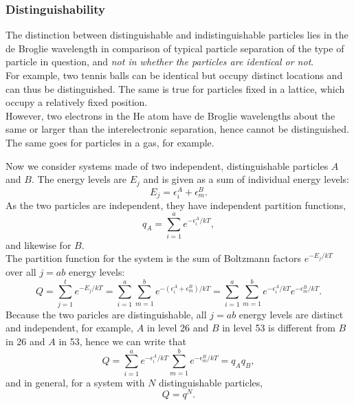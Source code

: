 \subsubsection{Distinguishability}
\begin{defi}[Distinguishability]
The distinction between distinguishable and indistinguishable particles lies in 
the de Broglie wavelength in comparison of typical particle separation of the 
type of particle in question, and \textit{not in whether the particles are identical or not}. \\
For example, two tennis balls can be identical but occupy distinct locations and can thus be distinguished. 
The same is true for particles fixed in a lattice, which occupy a relatively fixed position. \\
However, two electrons in the He atom have de Broglie wavelengths about the same or larger than the interelectronic separation, hence cannot be distinguished. 
The same goes for particles in a gas, for example. 
\end{defi}
Now we consider systems made of two independent, distinguishable particles $A$ and $B$. 
The energy levels are $E_j$ and is given as a sum of individual energy levels:
\begin{equation}
E_j=\epsilon_i^A+\epsilon_m^B.
\end{equation}
As the two particles are independent, they have independent partition functions,
\begin{equation}
q_A=\sum^{a}_{i=1} e^{-\epsilon_i^A/kT},
\end{equation}
and likewise for $B$. \\
The partition function for the system is the sum of Boltzmann factors $e^{-E_j/kT}$ over all $j=ab$ energy levels:
\begin{equation}
Q=\sum^{t}_{j=1} e^{-E_j/kT}=\sum^{a}_{i=1} \sum^{b}_{m=1} e^{-(\epsilon_i^A+\epsilon_m^B)/kT}=\sum^{a}_{i=1} \sum^{b}_{m=1} e^{-\epsilon_i^A/kT}e^{-\epsilon_m^B/kT}.
\end{equation}
Because the two paricles are distinguishable, all $j=ab$ energy levels are distinct and independent, for example, $A$ in level 26 and $B$ in level 53 is different from $B$ in 26 and $A$ in 53, hence we can write that
\begin{equation}
Q=\sum^{a}_{i=1} e^{-\epsilon_i^A/kT}\sum^{b}_{m=1} e^{-\epsilon_m^B/kT}=q_Aq_B, 
\end{equation}
and in general, for a system with $N$ distinguishable particles, 
\begin{equation}
Q=q^N.
\end{equation}
